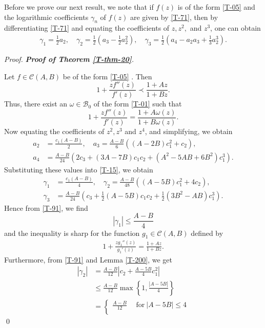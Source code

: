 \documentclass[a4paper,12pt]{amsart}
\theoremstyle{definition}
\newenvironment{pf}[1][]{%
 \vskip 3mm
 \noindent
 \ifthenelse{\equal{#1}{}}%
  {{\slshape Proof. }}%
  {{\slshape #1.} }%
 }%
{\qed\bigskip}
\begin{document}
Before we prove our next result, we note that if $f(z)$ is of the form \eqref{T-05} and the logarithmic coefficients $\gamma_n$ of $f(z)$ are given by \eqref{T-71}, then by differentiating \eqref{T-71} and equating the coefficients of $z, z^2,$ and $z^3$, one can obtain
\begin{align}\label{T-15}
\gamma_1=\frac{1}{2}a_2,\quad \gamma_2=\frac{1}{2}\left(a_3-\frac{1}{2}a_2^2\right),\quad \gamma_3=\frac{1}{2}\left(a_4-a_2a_3+\frac{1}{3}a_2^3\right).
\end{align}






\begin{pf}[\textbf{Proof of Theorem \ref{T-thm-20}}]
Let $ f \in \mathcal{C}(A,B) $ be of the form \eqref{T-05} . Then
$$
1 + \frac{zf''(z)}{f'(z)} \prec \frac{1+Az}{1+Bz}.
$$  
Thus, there exist an $\omega\in\mathcal{B}_0$ of the form \eqref{T-01} such that
$$
1 + \frac{zf''(z)}{f'(z)} = \frac{1+A \omega(z)}{1+B \omega(z)}.
$$
Now equating the coefficients of $z^2,z^3$ and $z^4$, and simplifying, we obtain
    \begin{align*}
    a_2&=\frac{c_1(A-B)}{2}, \quad a_3=\frac{A-B}{6}\left((A-2B)c_1^2+c_2\right),\\
    a_4&= \frac{A-B}{24}\left(2c_3+(3A-7B)c_{1}c_{2}+(A^2-5AB+6B^2)c_1^3\right).
    \end{align*}
Substituting these values into \eqref{T-15}, we obtain
\begin{align}
    \gamma_1&=\frac{c_1(A-B)}{4}, \quad \gamma_2=\frac{A-B}{48}\left((A-5B)c_1^2+4c_2\right),\label{T-91}\\
    \gamma_3&= \frac{A-B}{24}\left(c_3+\frac{1}{2}(A-5B)c_{1}c_{2}+\frac{1}{2}(3B^2-AB)c_1^3\right).\label{T-92}
    \end{align}
Hence from \eqref{T-91}, we find
    $$
     |\gamma_1| \leq \frac{A - B}{4}
    $$
    and the inequality is sharp for the function $g_1\in\mathcal{C}(A,B)$ defined by
\begin{align}\label{T-98}
1 + \frac{zg_1''(z)}{g_1'(z)} = \frac{1+Az}{1+B z}.
\end{align}
Furthermore, from \eqref{T-91} and Lemma \ref{T-200}, we get
\begin{align*}
|\gamma_2|
&=\frac{A-B}{12}\left|c_2+\frac{A-5B}{4}c_1^2\right|\\
&\le \frac{A-B}{12}\max\left\{1,\frac{|A-5B|}{4}\right\}\\
& =\begin{cases}\frac{A-B}{12} & ~~\text{for}~ |A-5B|\le 4\\[2mm]

\end{cases}
\end{align*}
\end{pf}
\end{document}
